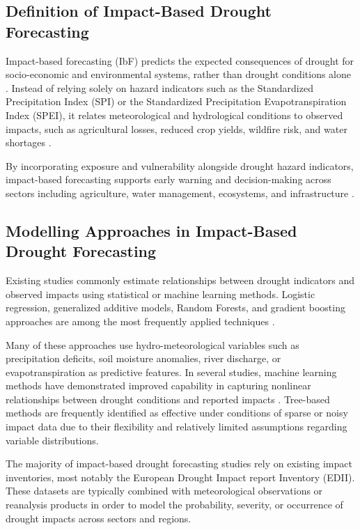\subsection{Definition of Impact-Based Drought Forecasting}

Impact-based forecasting (IbF) predicts the expected consequences of drought for socio-economic and environmental systems, rather than drought conditions alone \cite{WMO2021, PrevenionWeb2022, Shyrokaya2024Advances}. Instead of relying solely on hazard indicators such as the Standardized Precipitation Index (SPI) or the Standardized Precipitation Evapotranspiration Index (SPEI), it relates meteorological and hydrological conditions to observed impacts, such as agricultural losses, reduced crop yields, wildfire risk, and water shortages \cite{Sutanto2019Moving, Bulut2026Framework}.

By incorporating exposure and vulnerability alongside drought hazard indicators, impact-based forecasting supports early warning and decision-making across sectors including agriculture, water management, ecosystems, and infrastructure \cite{WMO2021, Shyrokaya2024Advances}.



\subsection{Modelling Approaches in Impact-Based Drought Forecasting}

Existing studies commonly estimate relationships between drought indicators and observed impacts using statistical or machine learning methods. Logistic regression, generalized additive models, Random Forests, and gradient boosting approaches are among the most frequently applied techniques \cite{Stagge2015Modeling, Bachmair2017Developing, Sutanto2019Moving, Bulut2026Framework}. 

Many of these approaches use hydro-meteorological variables such as precipitation deficits, soil moisture anomalies, river discharge, or evapotranspiration as predictive features. In several studies, machine learning methods have demonstrated improved capability in capturing nonlinear relationships between drought conditions and reported impacts \cite{Sutanto2019Moving, Bulut2026Framework}. Tree-based methods are frequently identified as effective under conditions of sparse or noisy impact data due to their flexibility and relatively limited assumptions regarding variable distributions.

The majority of impact-based drought forecasting studies rely on existing impact inventories, most notably the European Drought Impact report Inventory (EDII). These datasets are typically combined with meteorological observations or reanalysis products in order to model the probability, severity, or occurrence of drought impacts across sectors and regions.

